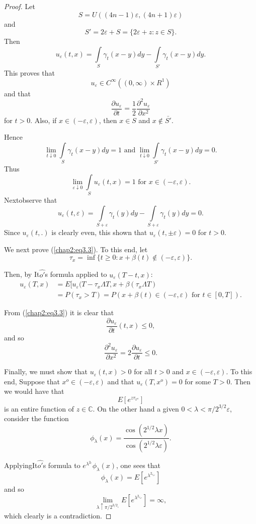  \begin{proof}
Let
$$
S=U((4n-1) \varepsilon, (4n+1)\varepsilon)
$$
and 
$$
S'= 2 \varepsilon+S= \{2 \varepsilon +z: z \in S\}.
$$
Then 
$$
u_\varepsilon(t,x) = \int\limits_{S} \gamma_t(x-y)dy- \int\limits_{S'}
\gamma_t (x-y) dy. 
$$
This proves that 
$$
u_\varepsilon \in C^\infty((0, \infty)\times R^1)
$$
and that 
$$
\frac{\partial u_\varepsilon}{\partial t}= \frac{1}{2}
\frac{{\partial^2u}_\varepsilon}{\partial x^2} 
$$
for $t > 0$. Also, if $x \in (-\varepsilon, \varepsilon)$, then $x \in
S$ and $x \notin \bar{S'}$. 

\noindent
 Hence 
 $$ 
 \lim_{t \downarrow 0} \int\limits_{S} \gamma_t (x-y)dy=1 \text{ and }
 \lim_{t \downarrow 0} \int\limits_{S'} \gamma_t (x-y) dy =0. 
 $$
  Thus
 $$
 \lim_{\varepsilon \downarrow 0} \int\limits_{S} u_\varepsilon(t,x) =1
 \text{ for } x \in (-\varepsilon, \varepsilon). 
 $$
  Next\pageoriginale observe that  
 $$
 u_\varepsilon(t,\varepsilon)=  \int\limits_{S+\varepsilon}\gamma_t(y)
 dy- \int\limits_{S+\varepsilon} \gamma_t (y)  dy=0. 
 $$
  Since $u_\varepsilon(t,.)$ is clearly even, this shown that
  $u_\varepsilon (t,\pm \varepsilon) =  0 $ for $t > 0$.  
 
 We next prove (\ref{chap2:eq3.3}). To this end, let
 $$
 \tau_x= \inf \{ t \ge 0 : x+ \beta(t) \not\in 
 (-\varepsilon, \varepsilon)\}. 
 $$
 
 Then, by It$\hat{o'}$s formula applied to $u_\varepsilon(T-t,x)$: 
 \begin{align*}
u_\varepsilon(T,x) &= E[u_\varepsilon(T- \tau_x \Lambda T, x+
  \beta(\tau_x \Lambda T)\\ 
&=P(\tau_x >T) =P(x+\beta(t) \in (-\varepsilon, \varepsilon)
\text{ for } t \in [0,T]). 
 \end{align*} 
 
 From (\ref{chap2:eq3.3}) it is clear that 
 $$
 \frac{\partial u_\varepsilon}{\partial t} (t,x) \le 0, 
 $$
 and so 
 $$
 \frac{{\partial^2u}_\varepsilon}{\partial x^2} = 2 \frac{\partial
   u_\varepsilon}{\partial t} \le 0. 
$$

Finally, we must show that $u_\varepsilon(t,x)>0$ for all $t > 0$ and
$x \in (-\varepsilon, \varepsilon)$. To this end, Suppose that $x^o \in
(-\varepsilon, \varepsilon)$ and that $u_\varepsilon(T,x^o)=0$ for some
$T >0$. Then we would have that  
$$
E[e^{z \tau_{x^o}}]  
$$
is an entire function of $z \in \mathbb{C}$. On the other hand a given
$0 < \lambda < \pi /2^{3/2} \varepsilon$, consider the function  
$$
\phi_\lambda(x)= \frac{\cos(2^{1/2}\lambda x)}{\cos (2^{1/2}\lambda
  \varepsilon)}. 
$$

Applying\pageoriginale  It$\hat{o'}$s formula to $e^{\lambda^{2_t}}
\phi_\lambda(x)$, one sees that  
$$
\phi_\lambda(x) = E[e^{\lambda^{2_{\tau_{x^o}}}}]
$$
and so
$$
\lim_{\lambda \uparrow
  \pi/2^{{3/2}_\varepsilon}}E[e^{\lambda^{2_{\tau_{x^o}}}}]= \infty, 
$$ 
which clearly is a contradiction. 
 \end{proof}

